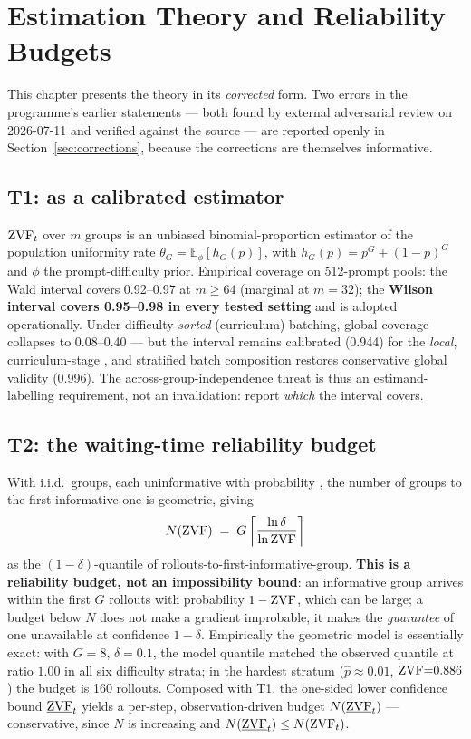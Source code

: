 \chapter{Estimation Theory and Reliability Budgets}
\label{ch:theory}

This chapter presents the theory in its \emph{corrected} form. Two errors in
the programme's earlier statements --- both found by external adversarial
review on 2026-07-11 and verified against the source --- are reported openly
in Section~\ref{sec:corrections}, because the corrections are themselves
informative.

\section{T1: \ZVF{} as a calibrated estimator}
$\mathrm{ZVF}_t$ over $m$ groups is an unbiased binomial-proportion estimator of the
population uniformity rate $\theta_G=\mathbb{E}_\phi[h_G(p)]$, with
$h_G(p)=p^G+(1-p)^G$ and $\phi$ the prompt-difficulty prior. Empirical
coverage on 512-prompt pools: the Wald interval covers 0.92--0.97 at
$m\ge64$ (marginal at $m{=}32$); the \textbf{Wilson interval covers
0.95--0.98 in every tested setting} and is adopted operationally.
Under difficulty-\emph{sorted} (curriculum) batching, global coverage
collapses to 0.08--0.40 --- but the interval remains calibrated (0.944) for
the \emph{local}, curriculum-stage \ZVF{}, and stratified batch composition
restores conservative global validity (0.996). The across-group-independence
threat is thus an estimand-labelling requirement, not an invalidation: report
\emph{which} \ZVF{} the interval covers.

\section{T2: the waiting-time reliability budget}
With i.i.d.\ groups, each uninformative with probability \ZVF{}, the number of
groups to the first informative one is geometric, giving
\[
N(\mathrm{ZVF}) \;=\; G\left\lceil \frac{\ln \delta}{\ln \mathrm{ZVF}}\right\rceil
\]
as the $(1{-}\delta)$-quantile of rollouts-to-first-informative-group.
\textbf{This is a reliability budget, not an impossibility bound}: an
informative group arrives within the first $G$ rollouts with probability
$1-\mathrm{ZVF}$, which can be large; a budget below $N$ does not make a gradient
improbable, it makes the \emph{guarantee} of one unavailable at confidence
$1-\delta$. Empirically the geometric model is essentially exact: with
$G{=}8$, $\delta{=}0.1$, the model quantile matched the observed quantile at
ratio $1.00$ in all six difficulty strata; in the hardest stratum
($\hat p\approx0.01$, $\mathrm{ZVF}{=}0.886$) the budget is 160 rollouts. Composed
with T1, the one-sided lower confidence bound $\underline{\mathrm{ZVF}}_t$ yields a
per-step, observation-driven budget $N(\underline{\mathrm{ZVF}}_t)$ --- conservative,
since $N$ is increasing and $N(\underline{\mathrm{ZVF}}_t)\le N(\mathrm{ZVF}_t)$.

